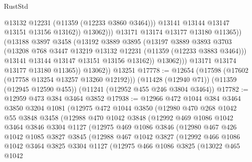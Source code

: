 \begin{lexlean}{RustStd}
\begin{coremodule}
{{{{{{{{{{{{{{{{{{{                                @13132
                                @12231
                                (@11359 (@12233 @3860 @3464)))
                              @13141
                              @13144
                              @13147
                              @13151
                              @13156
                              @13162))
                          @13062)))
                    @13171
                    @13174
                    @13177
                    @13180
                    @11365))
                (@13188
                  @3897
                  @3458
                  (@13192
                    @3889
                    @3895
                    (@13197
                      @3889
                      @3893
                      @3703
                      (@13208 @768 @3447 @13219 @13132 @12231 (@11359 (@12233 @3883 @3464)))
                      @13141
                      @13144
                      @13147
                      @13151
                      @13156
                      @13162))
                  @13062)))
            @13171
            @13174
            @13177
            @13180
            @11365))
        @13062))
    @13251
@17778 := @12654
    (@17598 (@17602 (@17758 @13254 @13257 @13260 @12192)))
    (@11428 (@12940 @71))
    (@11359 (@12945 @12590 @455))
    (@11241 (@12952 @455 @246 @3804 @3464))
@17782 := @12959 @473 @384 @3464 @3852
@17938 := @12966
    @472
    @1044
    @384
    @3464
    @3850
    @3204
    @1081
    (@12975
      @472
      @1044
      @3850
      (@12980
        @470
        @268
        @1042
        @55
        @3848
        @3458
        (@12988
          @470
          @1042
          @3848
          (@12992
            @469
            @1086
            @1042
            @3464
            @3846
            @3304
            @1127
            (@12975
              @469
              @1086
              @3846
              (@12980
                @467
                @426
                @1042
                @1085
                @3827
                @3845
                (@12988
                  @467
                  @1042
                  @3827
                  (@12992
                    @466
                    @1086
                    @1042
                    @3464
                    @3825
                    @3304
                    @1127
                    (@12975
                      @466
                      @1086
                      @3825
                      (@13022
                        @465
                        @1042
}}}}}}}}}}}}}}}}}}}
\end{coremodule}
\end{lexlean}
